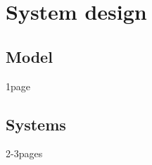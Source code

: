 \chapter{System design} \label{ch:sys_design}

\section{Model}

	1page

\section{Systems}

	2-3pages